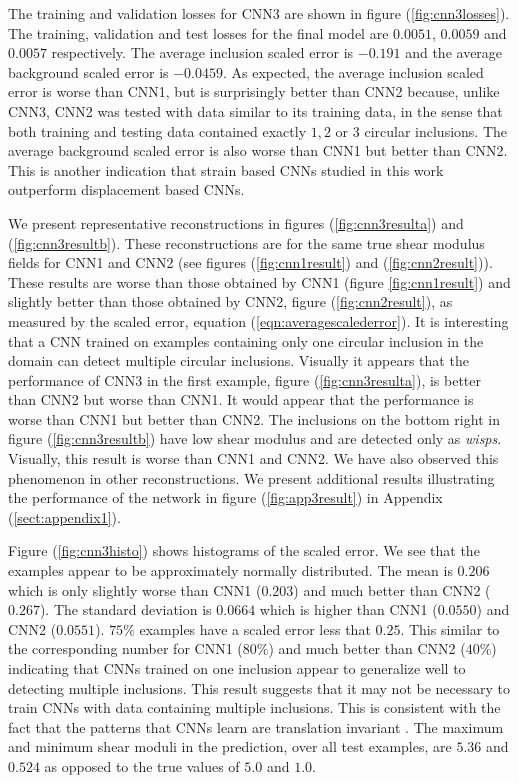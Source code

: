 \documentclass[12pt]{article}
\begin{document}
The training and validation losses for CNN3 are shown in figure (\ref{fig:cnn3losses}).  The training, validation and test losses for the final model are $0.0051$, $0.0059$ and $0.0057$ respectively. The average inclusion scaled error is $-0.191$ and the average background scaled error is $-0.0459$. As expected, the average inclusion scaled error is worse than CNN1, but is surprisingly better than CNN2 because, unlike CNN3, CNN2 was tested with data similar to its training data, in the sense that both training and testing data contained exactly $1,2$ or $3$ circular inclusions. The average background scaled error is also worse than CNN1 but better than CNN2. This is another indication that strain based CNNs studied in this work outperform displacement based CNNs.

We present representative reconstructions in figures (\ref{fig:cnn3resulta}) and (\ref{fig:cnn3resultb}). These reconstructions are for the same true shear modulus fields for CNN1 and CNN2 (see figures (\ref{fig:cnn1result}) and (\ref{fig:cnn2result})). These results are worse than those obtained by CNN1 (figure \ref{fig:cnn1result}) and slightly better than those obtained by CNN2, figure (\ref{fig:cnn2result}), as measured by the scaled error, equation (\ref{eqn:averagescalederror}). It is interesting that a CNN trained on examples containing only one circular inclusion in the domain can detect multiple circular inclusions. Visually it appears that the performance of CNN3 in the first example, figure (\ref{fig:cnn3resulta}), is better than CNN2 but worse than CNN1. It would appear that the performance is worse than CNN1 but better than CNN2. The inclusions on the bottom right in figure (\ref{fig:cnn3resultb}) have low shear modulus and are detected only as \textit{wisps}. Visually, this result is worse than CNN1 and CNN2. We have also observed this phenomenon in other reconstructions. We present additional results illustrating the performance of the network in figure (\ref{fig:app3result}) in Appendix (\ref{sect:appendix1}).

Figure (\ref{fig:cnn3histo}) shows histograms of the scaled error. We see that the examples appear to be approximately normally distributed. The mean is $0.206$ which is only slightly worse than CNN1 ($0.203$) and much better than CNN2 ($0.267$). The standard deviation is $0.0664$ which is higher than CNN1 ($0.0550$) and CNN2 ($0.0551$). $75\%$ examples have a scaled error less that $0.25$. This similar to the corresponding number for CNN1 ($80\%$) and much better than CNN2 ($40\%$) indicating that CNNs trained on one inclusion appear to generalize well to detecting multiple inclusions. This result suggests that it may not be necessary to train CNNs with data containing multiple inclusions. This is consistent with the fact that the patterns that CNNs learn are translation invariant \cite{book:chollet}. The maximum and minimum shear moduli in the prediction, over all test examples, are $5.36$ and $0.524$ as opposed to the true values of $5.0$ and $1.0$.
\end{document}
